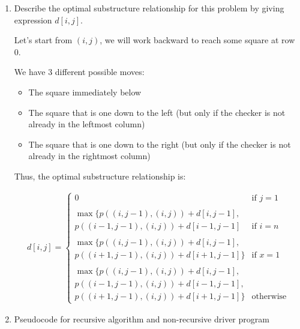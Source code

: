 \documentclass{cpsc413Solutions}
\begin{document}
\begin{problemlist}
\begin{problem}
\begin{problem}
\begin{answer}
\begin{enumerate}
\begin{itemize}
    \end{itemize}
    
\newpage
    \item Describe the optimal substructure relationship for this problem by giving expression $d[i,j]$.
    
    Let's start from $(i,j)$, we will work backward to reach some square at row 0.
    
    We have 3 different possible moves: 
    
    \begin{itemize}
        \item The square immediately below
        \item The square that is one down to the left (but only if the checker is not already in the leftmost column)
        \item The square that is one down to the right (but only if the checker is not already in the rightmost column)
    \end{itemize}
    
    Thus, the optimal substructure relationship is:
    
    
    \begin{align*}
    d[i,j] = 
        \begin{cases}
        0   &\text{if $j=1$}\\
        \\
        \max\{p((i,j-1), (i,j))+d[i,j-1],\\
               p((i-1,j-1), (i,j))+ d[i-1,j-1] & \text{if $i=n$}\\
               \\
        \max\{p((i,j-1), (i,j))+d[i,j-1],\\
               p((i+1,j-1), (i,j))+d[i+1,j-1]\} & \text{if $x=1$}\\
               \\
        \max\{p((i,j-1), (i,j))+d[i,j-1],\\
               p((i-1,j-1), (i,j))+ d[i-1,j-1],\\
               p((i+1,j-1), (i,j))+d[i+1,j-1]\} & \text{otherwise}
        \end{cases}
    \end{align*}
    
    \newpage
    
    \item Pseudocode for recursive algorithm and non-recursive driver program\\
    

\end{enumerate}
\end{answer}
\end{problem}
\end{problem}
\end{problemlist}
\end{document}
